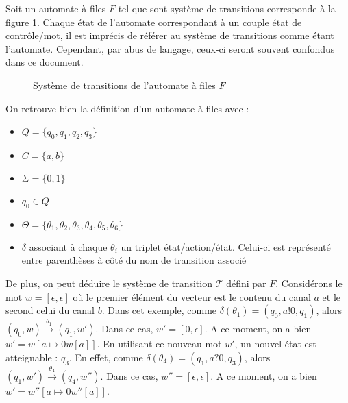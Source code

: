 \begin{example}
  Soit un automate à files $F$ tel que sont système de transitions corresponde à la figure \ref{fig:fifo1}. Chaque état de l'automate correspondant à un couple état de contrôle/mot, il est imprécis de référer au système de transitions comme étant l'automate. Cependant, par abus de langage, ceux-ci seront souvent confondus dans ce document.

  \begin{figure}[H]
    \centering
    \caption{Système de transitions de l'automate à files $F$}\label{fig:fifo1}
  \end{figure}

  On retrouve bien la définition d'un automate à files \fifo avec :
  \begin{itemize}
    \item $Q=\{q_0,q_1,q_2,q_3\}$
    \item $C=\{a,b\}$
    \item $\Sigma=\{0,1\}$
    \item $q_0\in Q$
    \item $\Theta=\{\theta_1, \theta_2, \theta_3, \theta_4, \theta_5, \theta_6\}$
    \item $\delta$ associant à chaque $\theta_i$ un triplet état/action/état. Celui-ci est représenté entre parenthèses à côté du nom de transition associé
  \end{itemize}

  De plus, on peut déduire le système de transition $\mathcal{T}$ défini par $F$. Considérons le mot $w=[\epsilon,\epsilon]$ où le premier élément du vecteur est le contenu du canal $a$ et le second celui du canal $b$.
  Dans cet exemple, comme $\delta(\theta_1)=(q_0,a!0,q_1)$, alors $(q_0,w)\xrightarrow{\theta_1}(q_1,w')$. Dans ce cas, $w'=[0,\epsilon]$. A ce moment, on a bien $w'=w[a\mapsto 0w[a]]$.
  En utilisant ce nouveau mot $w'$, un nouvel état est atteignable : $q_3$. En effet, comme $\delta(\theta_4)=(q_1,a?0,q_3)$, alors $(q_1,w')\xrightarrow{\theta_4}(q_4,w'')$. Dans ce cas, $w''=[\epsilon,\epsilon]$. A ce moment, on a bien $w'=w''[a\mapsto 0w''[a]]$.


\end{example}
